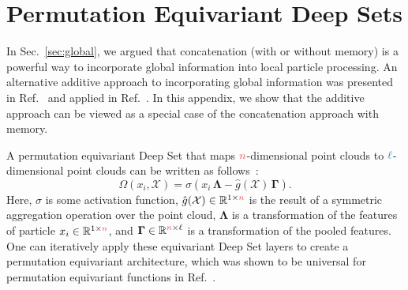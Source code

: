 \documentclass[aps,prd,twocolumn,superscriptaddress,floatfix,longbibliography,preprintnumbers,nofootinbib]{revtex4-1} %
\newcommand{\vect}[1]{\boldsymbol{\mathbf{#1}}}
\DeclareRobustCommand{\Sec}[1]{Sec.~\ref{sec:#1}}
\DeclareRobustCommand{\RRef}[1]{Ref.~\cite{#1}}
\newcommand{\reft}[1]{Ref.~\cite{#1}}
\begin{document}
\appendix


\section{Permutation Equivariant Deep Sets}
\label{app:equiv_deep_set}

In \Sec{global}, we argued that concatenation (with or without memory) is a powerful way to incorporate global information into local particle processing.
%
An alternative additive approach to incorporating global information was presented in \reft{Zaheer2017} and applied in \RRef{Dolan:2020qkr}.
%
In this appendix, we show that the additive approach can be viewed as a special case of the concatenation approach with memory.


A permutation equivariant Deep Set that maps ${\color{c1}n}$-dimensional point clouds to ${\color{c3}\ell}$-dimensional point clouds can be written as follows~\cite{Zaheer2017}:
%      
      \begin{equation}
        \Omega(x_i, \mathcal X) = \sigma(x_i \, \vect\Lambda- \hat g(\mathcal X ) \, \vect\Gamma).
      \label{eq:equiv_deep_set}
    \end{equation}
%
Here, $\sigma$ is some activation function, $\hat{g}(\mathcal X)\in\mathbb R^{1\times {\color{c1}n}}$ is the result of a symmetric aggregation operation over the point cloud, $\vect\Lambda$ is a transformation of the features of particle $x_i\in\mathbb R^{1\times {\color{c1}n}}$, and $\vect\Gamma\in\mathbb R^{{\color{c1}n}\times \ell}$ is a transformation of the pooled features.
%
One can iteratively apply these equivariant Deep Set layers to create a permutation equivariant architecture, which was shown to be universal for permutation equivariant functions in \reft{Segol2020}.
\end{document}
